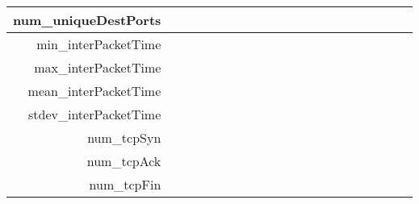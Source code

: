 \documentclass[11pt]{article}
\begin{document}
\begin{landscape}
\begin{table}
\begin{tabular}{r | l | l | l | l | l | l | l | l | l | l | l | l | l | l | l | l | l | l | l }
		num\_uniqueDestPorts	& \cellcolor{low} & \cellcolor{low} &  &  &  &  &  &  &  &  &  &  &  &  &  &  &  &  &  \\ \hline
		min\_interPacketTime	& \cellcolor{none} & \cellcolor{none} &  &  &  &  &  &  &  &  &  &  &  &  &  &  &  &  &  \\ \hline
		max\_interPacketTime	& \cellcolor{none} & \cellcolor{none} &  &  &  &  &  &  &  &  &  &  &  &  &  &  &  &  &  \\ \hline
		mean\_interPacketTime	& \cellcolor{none} & \cellcolor{none} &  &  &  &  &  &  &  &  &  &  &  &  &  &  &  &  &  \\ \hline
		stdev\_interPacketTime	& \cellcolor{none} & \cellcolor{none} &  &  &  &  &  &  &  &  &  &  &  &  &  &  &  &  &  \\ \hline
		num\_tcpSyn				& \cellcolor{none} & \cellcolor{none} &  &  &  &  &  &  &  &  &  &  &  &  &  &  &  &  &  \\ \hline
		num\_tcpAck				& \cellcolor{none} & \cellcolor{none} &  &  &  &  &  &  &  &  &  &  &  &  &  &  &  &  &  \\ \hline
		num\_tcpFin				& \cellcolor{none} & \cellcolor{none} &  &  &  &  &  &  &  &  &  &  &  &  &  &  &  &  &  
		\end{tabular}
	\end{table}
\end{landscape}


 

\end{document}

